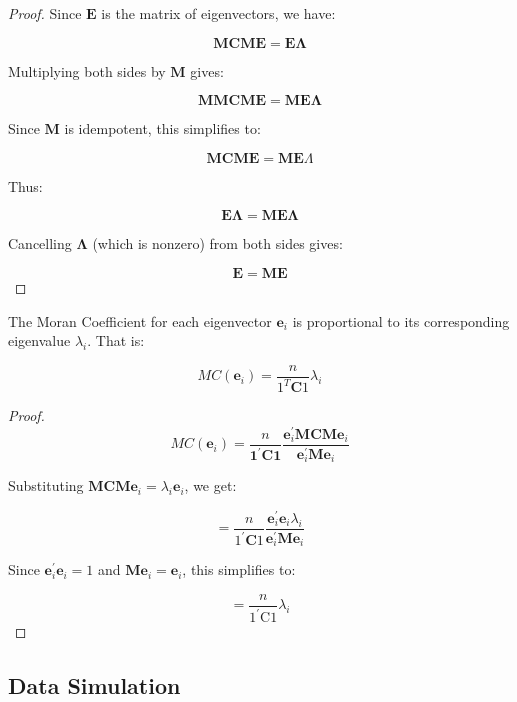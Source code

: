 \documentclass[12pt]{article}
\begin{document}
\begin{proof}

  Since \(\mathbf{E}\) is the matrix of eigenvectors, we have:

  \[
    \mathbf{M C M E}=\mathbf{E} \boldsymbol{\Lambda}
  \]

  Multiplying both sides by \(\mathbf{M}\) gives:

  \[
    \mathbf{MMCME}=\mathbf{ME} \boldsymbol{\Lambda}
  \]

  Since \(\mathbf{M}\) is idempotent, this simplifies to:

  \[
    \mathbf{MCME}=\mathbf{ME} \Lambda
  \]

  Thus:

  \[
    \mathbf{E} \boldsymbol{\Lambda}=\mathbf{M E} \boldsymbol{\Lambda}
  \]

  Cancelling \(\boldsymbol{\Lambda}\) (which is nonzero) from both sides gives:

  \[
    \mathbf{E}=\mathbf{M E}
  \]

\end{proof}

The Moran Coefficient for each eigenvector \(\mathbf{e}_i\) is proportional to its corresponding eigenvalue \(\lambda_i\). That is:

\[
  M C\left(\mathbf{e}_i\right)=\frac{n}{1^T \mathbf{C} 1} \lambda_i
\]

\begin{proof}

  \[
    M C\left(\mathbf{e}_i\right)=\frac{n}{\mathbf{1}^{\prime} \mathbf{C} \mathbf{1}} \frac{\mathbf{e}_i^{\prime} \mathbf{M C M e}_i}{\mathbf{e}_i^{\prime} \mathbf{M e}_i}
  \]

  Substituting \(\mathbf{M C M e}_i=\lambda_i \mathbf{e}_i\), we get:

  \[
    =\frac{n}{1^{\prime} \mathbf{C} 1} \frac{\mathbf{e}_i^{\prime} \mathbf{e}_i \lambda_i}{\mathbf{e}_i^{\prime} \mathbf{M e}_i}
  \]

  Since \(\mathbf{e}_i^{\prime} \mathbf{e}_i=1\) and \(\mathbf{M e}_i=\mathbf{e}_i\), this simplifies to:

  \[
    =\frac{n}{1^{\prime} \mathrm{C} 1} \lambda_i
  \]
\end{proof}



\subsection*{Data Simulation}
\end{document}
